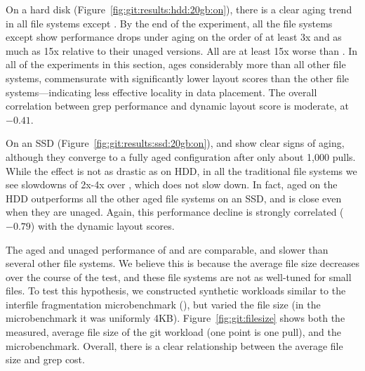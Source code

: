 



On a hard disk (Figure~\ref{fig:git:results:hdd:20gb:on}), there is a clear
aging trend in all file systems except \betrfs.  By the end of the experiment,
all the file systems except \betrfs show performance drops under aging on the
order of at least 3x and as much as 15x relative to their unaged versions. All
are at least 15x worse than \betrfs. In all of the experiments in this section,
\ftwofs ages considerably more than all other file systems, commensurate with
significantly lower layout scores than the other file systems---indicating less
effective locality in data placement. The overall correlation between grep
performance and dynamic layout score is moderate, at $-0.41$. 

On an SSD (Figure~\ref{fig:git:results:ssd:20gb:on}), \btrfs and \xfs show
clear signs of aging, although they converge to a fully aged configuration
after only about 1,000 pulls. While the effect is not as drastic as on HDD, in
all the traditional file systems we see slowdowns of 2x-4x over \betrfs, which
does not slow down.  In fact, aged \betrfs on the HDD outperforms all the other
aged file systems on an SSD, and is close even when they are unaged. Again,
this performance decline is strongly correlated ($-0.79$) with the dynamic
layout scores.

The aged and unaged performance of \ext and \zfs are comparable, and slower
than several other file systems.  We believe this is because the average file
size decreases over the course of the test, and these file systems are not as
well-tuned for small files.  To test this hypothesis, we constructed
synthetic workloads similar to the interfile fragmentation microbenchmark
(), but varied the file size (in the microbenchmark it
was uniformly 4KB). 
Figure~\ref{fig:git:filesize} shows both the measured, average file
size of the git workload (one point is one pull), and the microbenchmark.
Overall, there is a clear relationship between the average file size and grep
cost. 

